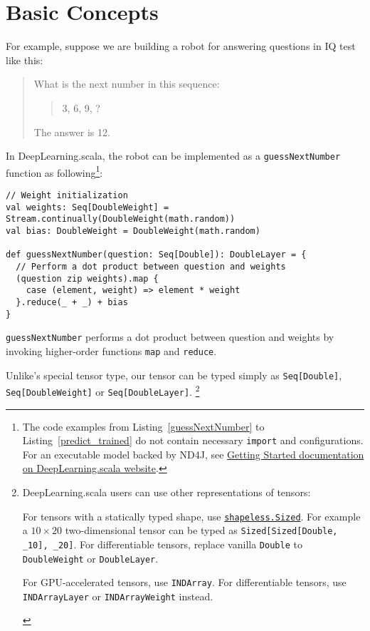 \section{Basic Concepts}\label{concepts}

For example, suppose we are building a robot for answering questions in IQ test like this:

\begin{quote}
  What is the next number in this sequence:
    \begin{quote}
    3, 6, 9, ?
    \end{quote}
  The answer is 12.
\end{quote}

In DeepLearning.scala, the robot can be implemented as a \lstinline{guessNextNumber} function as following\footnote{The code examples from Listing~\ref{guessNextNumber} to Listing~\ref{predict_trained} do not contain necessary \lstinline{import} and configurations. For an executable model backed by ND4J\cite{skymind2017nd4j}, see \href{http://deeplearning.thoughtworks.school/demo/GettingStarted.html}{Getting Started documentation on DeepLearning.scala website}.}:

\begin{lstlisting}[float={h t b p},caption={The differentiable matrix multiplication implemented by \lstinline{map}/\lstinline{reduce}},label={guessNextNumber}]
// Weight initialization
val weights: Seq[DoubleWeight] = Stream.continually(DoubleWeight(math.random))
val bias: DoubleWeight = DoubleWeight(math.random)

def guessNextNumber(question: Seq[Double]): DoubleLayer = {
  // Perform a dot product between question and weights
  (question zip weights).map {
    case (element, weight) => element * weight
  }.reduce(_ + _) + bias
}
\end{lstlisting}

\lstinline{guessNextNumber} performs a dot product between question and weights by invoking higher-order functions \lstinline{map} and \lstinline{reduce}. 

Unlike\cite{chen2017typesafe}'s special tensor type, our tensor can be typed simply as \lstinline{Seq[Double]}, \lstinline{Seq[DoubleWeight]} or \lstinline{Seq[DoubleLayer]}.
\footnote{DeepLearning.scala users can use other representations of tensors:
\begin{enumerate*}
  \item For tensors with a statically typed shape, use \href{https://javadoc.io/page/com.chuusai/shapeless_2.11/latest/shapeless/Sized.html}{ \lstinline{shapeless.Sized}}. For example a \(10\times20\) two-dimensional tensor can be typed as \lstinline{Sized[Sized[Double, _10], _20]}. For differentiable tensors, replace vanilla \lstinline{Double} to \lstinline{DoubleWeight} or \lstinline{DoubleLayer}.
  \item For GPU-accelerated tensors, use \lstinline{INDArray}\cite{skymind2017nd4j}. For differentiable tensors, use \lstinline{INDArrayLayer} or \lstinline{INDArrayWeight} instead.
\end{enumerate*}
}


